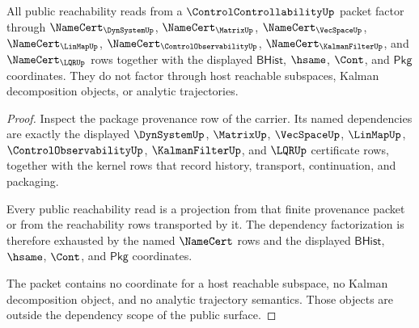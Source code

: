 \begin{theorem}
\label{thm:controlcontrollability-dependency-scope-obligation}
All public reachability reads from a $\ControlControllabilityUp$ packet factor through $\NameCert_{\DynSystemUp}$, $\NameCert_{\MatrixUp}$, $\NameCert_{\VecSpaceUp}$, $\NameCert_{\LinMapUp}$, $\NameCert_{\ControlObservabilityUp}$, $\NameCert_{\KalmanFilterUp}$, and $\NameCert_{\LQRUp}$ rows together with the displayed $\mathsf{BHist}$, $\hsame$, $\Cont$, and $\mathsf{Pkg}$ coordinates. They do not factor through host reachable subspaces, Kalman decomposition objects, or analytic trajectories.
\end{theorem}
\begin{proof}
Inspect the package provenance row of the carrier. Its named dependencies are exactly the displayed $\DynSystemUp$, $\MatrixUp$, $\VecSpaceUp$, $\LinMapUp$, $\ControlObservabilityUp$, $\KalmanFilterUp$, and $\LQRUp$ certificate rows, together with the kernel rows that record history, transport, continuation, and packaging.

Every public reachability read is a projection from that finite provenance packet or from the reachability rows transported by it. The dependency factorization is therefore exhausted by the named $\NameCert$ rows and the displayed $\mathsf{BHist}$, $\hsame$, $\Cont$, and $\mathsf{Pkg}$ coordinates.

The packet contains no coordinate for a host reachable subspace, no Kalman decomposition object, and no analytic trajectory semantics. Those objects are outside the dependency scope of the public surface.
\end{proof}

